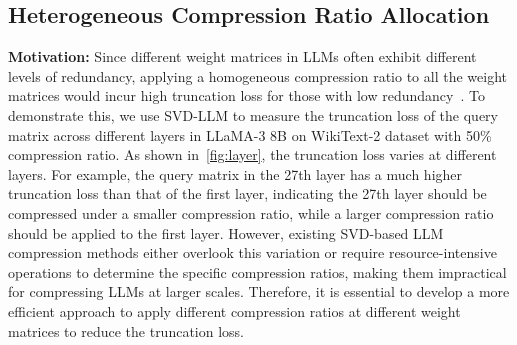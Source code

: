 

\subsection{Heterogeneous Compression Ratio Allocation}
\label{subsec:dynamic_ratio_allocation}
\noindent \textbf{Motivation:} Since different weight matrices in LLMs often exhibit different levels of redundancy, applying a homogeneous compression ratio to all the weight matrices would incur high truncation loss for those with low redundancy~\citep{DBLP:journals/corr/abs-2406-10594,DBLP:journals/corr/abs-2406-15786,DBLP:journals/corr/abs-2407-19126}. 
%
To demonstrate this, we use SVD-LLM to measure the truncation loss of the query matrix across different layers in LLaMA-3 8B on WikiText-2 dataset with 50\% compression ratio. 
%
As shown in~\cref{fig:layer}, the truncation loss varies at different layers. For example, the query matrix in the 27th layer has a much higher truncation loss than that of the first layer, indicating the 27th layer should be compressed under a smaller compression ratio, while a larger compression ratio should be applied to the first layer. 
%
However, existing SVD-based LLM compression methods either overlook this variation or require resource-intensive operations to determine the specific compression ratios, making them impractical for compressing LLMs at larger scales. 
%
Therefore, it is essential to develop a more efficient approach to apply different compression ratios at different weight matrices to reduce the truncation loss.


